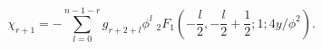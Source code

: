 \begin{equation}
\chi_{r+1} = - \sum \limits_{l=0}^{n-1-r} g_{r+2+l} \phi^l \; _2 F_1 (- \frac{l}{2}, - \frac{l}{2} +\frac{1}{2} ; 1 ; 4 y/\phi^2 ) .
\label{mchyper}
\end{equation}

